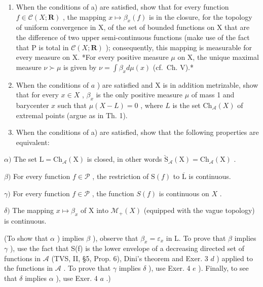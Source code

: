 \begin{enumerate}
\def\labelenumi{\alph{enumi})}
\setcounter{enumi}{1}
\item
  When the conditions of a) are satisfied, show that for every function \(f \in \mathcal{C}(X; \mathbf{R})\) , the mapping \(x \mapsto \beta_x(f)\) is in the closure, for the topology of uniform convergence in X, of the set of bounded functions on X that are the difference of two upper semi-continuous functions (make use of the fact that P is total in \(\mathcal{C}(X; \mathbf{R})\) ); consequently, this mapping is measurable for every measure on X. *For every positive measure \(\mu\) on X, the unique maximal measure \(\nu \succ \mu\) is given by \(\nu = \int \beta_x d\mu(x)\) (cf.~Ch. V).*
\item
  When the conditions of \(a\) ) are satisfied and X is in addition metrizable, show that for every \(x \in X\) , \(\beta_x\) is the only positive measure \(\mu\) of mass 1 and barycenter \(x\) such that \(\mu(X - L) = 0\) , where \(L\) is the set \(\mathrm{Ch}_{\mathcal{A}}(X)\) of extremal points (argue as in Th. 1).
\item
  When the conditions of a) are satisfied, show that the following properties are equivalent:
\end{enumerate}

\(\alpha)\) The set \(\mathrm{L} = \mathrm{Ch}_{\mathcal{A}}(\mathrm{X})\) is closed, in other words \(\check{\mathrm{S}}_{\mathcal{A}}(\mathrm{X}) = \mathrm{Ch}_{\mathcal{A}}(\mathrm{X})\) .

\(\beta)\) For every function \(f \in \mathcal{P}\) , the restriction of \(\mathrm{S}(f)\) to \(\overline{\mathrm{L}}\) is continuous.

\(\gamma)\) For every function \(f \in \mathcal{P}\) , the function \(S(f)\) is continuous on \(X\) .

\(\delta)\) The mapping \(x \mapsto \beta_x\) of X into \(\mathcal{M}_+(X)\) (equipped with the vague topology) is continuous.

(To show that \(\alpha\) ) implies \(\beta\) ), observe that \(\beta_x = \varepsilon_x\) in L. To prove that \(\beta\) implies \(\gamma\) ), use the fact that S(f) is the lower envelope of a decreasing directed set of functions in \(\mathcal{A}\) (TVS, II, §5, Prop. 6), Dini's theorem and Exer. 3 \(d\) ) applied to the functions in \(\mathcal{A}\) . To prove that \(\gamma\) implies \(\delta\) ), use Exer. 4 \(e\) ). Finally, to see that \(\delta\) implies \(\alpha\) ), use Exer. 4 \(a\) .)

